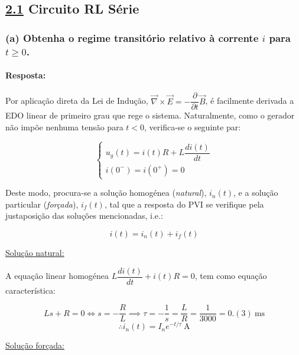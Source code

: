 \def\delequal{\mathrel{\ensurestackMath{\stackon[1pt]{=}{\scriptstyle\Delta}}}}
\subsection*{\underline{2.1} Circuito RL Série}
\subsubsection*{(a) Obtenha o regime transitório relativo à corrente $i$ para $t \ge 0$.}
\label{subsubsec_a}
\paragraph{Resposta:}
Por aplicação direta da Lei de Indução, $\overrightarrow{\nabla} \times \overrightarrow{E} = -\dfrac{\partial}{\partial t}\overrightarrow{B}$, é facilmente derivada a EDO linear de primeiro grau que rege o sistema. Naturalmente, como o gerador não impõe nenhuma tensão para $t < 0$, verifica-se o seguinte par:

$$
    \begin{cases}
        u_g(t) = i(t)R + L \dfrac{di(t)}{dt} \\
        i(0^-) = i(0^+) = 0
    \end{cases}
$$

Deste modo, procura-se a solução homogénea (\textit{natural}), $i_n(t)$, e a solução particular (\textit{forçada}), $i_f(t)$, tal que a resposta do PVI se verifique pela justaposição das soluções mencionadas, i.e.:

\begin{equation}
    \label{eq1}
    i(t) = i_n(t) + i_f(t)
\end{equation}

\noindent
\underline{Solução natural:} 

A equação linear homogénea $L \dfrac{di(t)}{dt} + i(t)R = 0$, tem como equação característica: 

$$
    Ls + R = 0 \iff s = -\frac{R}{L} \implies \tau = -\frac{1}{s} = \frac{L}{R} = \frac{1}{3000} = 0.(3)\ \text{ms} 
$$
$$
    \therefore i_n(t) = I_n e^{-t/\tau}\ \text{A}
$$

\vspace{0.5cm}
\noindent
\underline{Solução forçada:}
\vspace{0.25cm}

